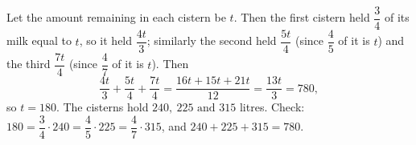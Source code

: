 Let the amount remaining in each cistern be $t$. Then the first cistern held $\dfrac{3}{4}$ of its milk equal to $t$, so it held $\dfrac{4t}{3}$; similarly the second held $\dfrac{5t}{4}$ (since $\dfrac{4}{5}$ of it is $t$) and the third $\dfrac{7t}{4}$ (since $\dfrac{4}{7}$ of it is $t$). Then
\[
\dfrac{4t}{3}+\dfrac{5t}{4}+\dfrac{7t}{4}=\dfrac{16t+15t+21t}{12}=\dfrac{13t}{3}=780,
\]
so $t=180$. The cisterns hold $\boxed{240,\ 225\text{ and }315}$ litres. Check: $180=\dfrac{3}{4}\cdot240=\dfrac{4}{5}\cdot225=\dfrac{4}{7}\cdot315$, and $240+225+315=780$.
